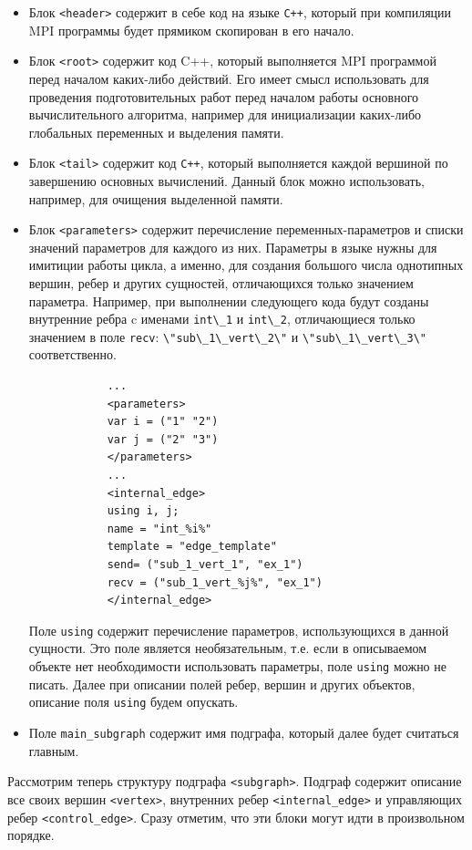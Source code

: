 \documentclass[a4paper, 12pt]{article}
\newcommand{\cd}[1]{\lstinline$#1$}
\begin{document}
	\begin{itemize}
		\item Блок \lstinline$<header>$  содержит в себе код на языке \lstinline$C++$, который при компиляции MPI программы будет прямиком скопирован в его начало. 
		\item Блок \lstinline$<root>$ содержит код C++, который выполняется MPI программой перед началом каких-либо действий. Его имеет смысл использовать для проведения подготовительных работ перед началом работы основного вычислительного алгоритма, например для инициализации каких-либо глобальных переменных и выделения памяти. 
		\item Блок \lstinline$<tail>$ содержит код \lstinline$C++$, который выполняется каждой вершиной по завершению основных вычислений. Данный блок можно использовать, например, для очищения выделенной памяти. 
		\item Блок \cd{<parameters>} содержит перечисление переменных-параметров и списки значений параметров для каждого из них. Параметры в языке нужны для имитиции работы цикла, а именно, для создания большого числа однотипных вершин, ребер и других сущностей, отличающихся только значением параметра. Например, при выполнении следующего кода будут созданы внутренние ребра c именами \cd{int\_1} и \cd{int\_2}, отличающиеся только значением в поле \cd{recv}: \cd{\"sub\_1\_vert\_2\"} и \cd{\"sub\_1\_vert\_3\"} соответственно.
		\begin{lstlisting}
			...
			<parameters>
			var i = ("1" "2")
			var j = ("2" "3")
			</parameters>
			...
			<internal_edge>
			using i, j;
			name = "int_%i%"
			template = "edge_template"
			send= ("sub_1_vert_1", "ex_1")
			recv = ("sub_1_vert_%j%", "ex_1")
			</internal_edge>
		\end{lstlisting}
		Поле \cd{using} содержит перечисление параметров, использующихся в данной сущности. Это поле является необязательным, т.е. если в описываемом объекте нет необходимости использовать параметры, поле \cd{using} можно не писать. Далее при описании полей ребер, вершин и других объектов, описание поля \cd{using} будем опускать.
		\item Поле \lstinline$main_subgraph$ содержит имя подграфа, который далее будет считаться главным.
	\end{itemize}
	Рассмотрим теперь структуру подграфа \lstinline$<subgraph>$. Подграф содержит описание все своих вершин \lstinline$<vertex>$, внутренних ребер \lstinline$<internal_edge>$ и управляющих ребер \lstinline$<control_edge>$. Сразу отметим, что эти блоки могут идти в произвольном порядке.
\end{document}
